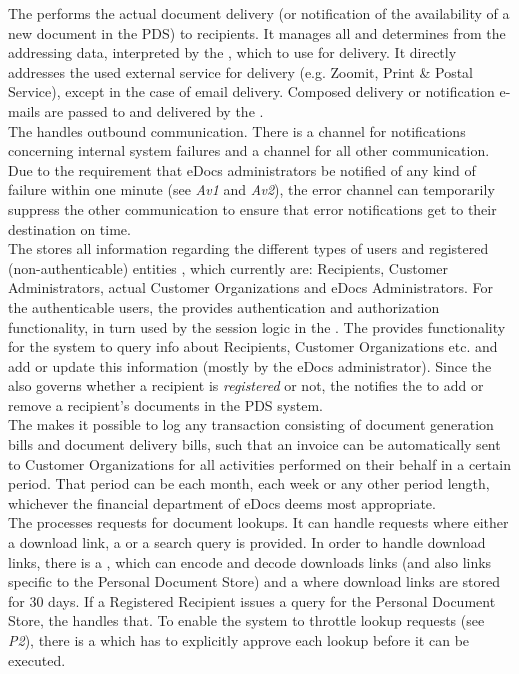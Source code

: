 The  performs the actual document delivery (or notification of the availability of a new document in the PDS) to recipients. It manages all  and determines from the addressing data, interpreted by the , which  to use for delivery. It directly addresses the used external service for delivery (e.g. Zoomit, Print \& Postal Service), except in the case of email delivery. Composed delivery or notification e-mails are passed to and delivered by the .\\
The  handles outbound communication. There is a channel for notifications concerning internal system failures and a channel for all other communication. Due to the requirement that eDocs administrators be notified of any kind of failure within one minute (see \emph{Av1} and \emph{Av2}), the error channel can temporarily suppress the other communication to ensure that error notifications get to their destination on time.\\
The  stores all information regarding the different types of users and registered (non-authenticable) entities , which currently are: Recipients, Customer Administrators, actual Customer Organizations and eDocs Administrators. For the authenticable users, the  provides authentication and authorization functionality, in turn used by the session logic in the . The  provides functionality for the system to query info about Recipients, Customer Organizations etc. and add or update this information (mostly by the eDocs administrator). Since the  also governs whether a recipient is \emph{registered} or not, the  notifies the  to add or remove a recipient's documents in the PDS system.\\
The  makes it possible to log any transaction consisting of document generation bills and document delivery bills, such that an invoice can be automatically sent to Customer Organizations for all activities performed on their behalf in a certain period. That period can be each month, each week or any other period length, whichever the financial department of eDocs deems most appropriate.\\
The  processes requests for document lookups. It can handle requests where either a download link, a  or a search query is provided. In order to handle download links, there is a , which can encode and decode downloads links (and also links specific to the Personal Document Store) and a  where download links are stored for 30 days. If a Registered Recipient issues a query for the Personal Document Store, the  handles that. To enable the system to throttle lookup requests (see \emph{P2}), there is a  which has to explicitly approve each lookup before it can be executed.\\
